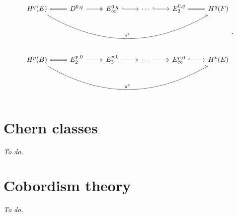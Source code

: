 \documentclass[10pt,letterpaper,cm]{nupset}
\theoremstyle{definition}
\theoremstyle{theorem}
\theoremstyle{remark}
\newcommand{\1}{\mathbb{1}}
\newcommand{\0}{\vec 0}
\begin{document}
\[
\begin{tikzcd}
H^q(E) \arrow[r, equals] \arrow[rrrrr, "i^{\ast}", bend right]   & {D^{0,q}} \arrow[r, two heads]   & {E_{\infty}^{0,q}} \arrow[r, hook] & \cdots \arrow[r, hook]      & {E_2^{0,q}} \arrow[r, equals]              & H^q(F) \\
                                                         &                                  &                                    &                             &                                    &        \\
                                                                                                                  &                                  &                                    &                             &                                    &        \\
H^p(B) \arrow[r, equals] \arrow[rrrrr, "\pi^{\ast}", bend right] & {E_2^{p,0}} \arrow[r, two heads] & {E_3^{p,0}} \arrow[r, two heads]   & \cdots \arrow[r, two heads] & {E_{\infty}^{p,0}} \arrow[r, hook] & H^p(E)
\end{tikzcd}.
\]

\section{Chern classes}

\textit{To do.}

\section{Cobordism theory}

\textit{To do.}
\end{document}
